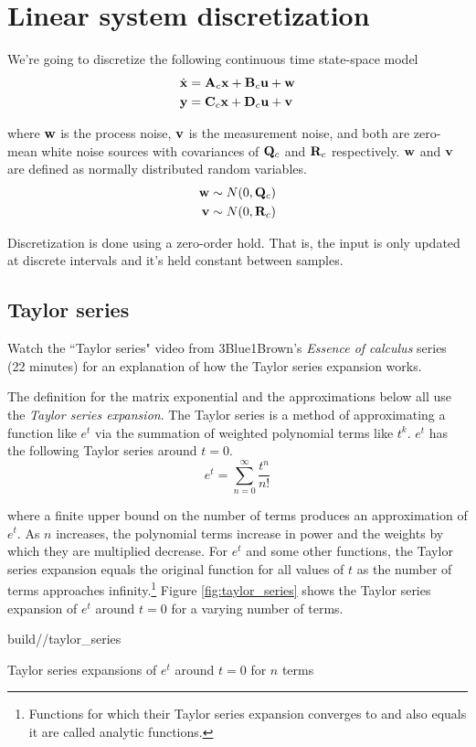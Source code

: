 \section{Linear system discretization}
\label{sec:linear_system_zoh}

We're going to discretize the following continuous time state-space model
\begin{align*}
  \dot{\mathbf{x}} &= \mathbf{A}_c\mathbf{x} + \mathbf{B}_c\mathbf{u} + \mathbf{w} \\
  \mathbf{y} &= \mathbf{C}_c\mathbf{x} + \mathbf{D}_c\mathbf{u} + \mathbf{v}
\end{align*}

where $\mathbf{w}$ is the process noise, $\mathbf{v}$ is the measurement noise, and
both are zero-mean white noise sources with covariances of $\mathbf{Q}_c$ and
$\mathbf{R}_c$ respectively. $\mathbf{w}$ and $\mathbf{v}$ are defined as normally
distributed random variables.
\begin{align*}
  \mathbf{w} &\sim N(0, \mathbf{Q}_c) \\
  \mathbf{v} &\sim N(0, \mathbf{R}_c)
\end{align*}

Discretization is done using a zero-order hold. That is, the input is only
updated at discrete intervals and it’s held constant between samples.

\subsection{Taylor series}
\begin{remark}
  Watch the ``Taylor series" video from 3Blue1Brown's \textit{Essence of
  calculus} series (22 minutes) \cite{bib:3b1b_calculus_taylor_series} for an
  explanation of how the Taylor series expansion works.
\end{remark}

The definition for the matrix exponential and the approximations below all use
the \textit{Taylor series expansion}. The Taylor series is a method of
approximating a function like $e^t$ via the summation of weighted polynomial
terms like $t^k$. $e^t$ has the following Taylor series around $t = 0$.
\begin{equation*}
  e^t = \sum_{n = 0}^\infty \frac{t^n}{n!}
\end{equation*}

where a finite upper bound on the number of terms produces an approximation of
$e^t$. As $n$ increases, the polynomial terms increase in power and the weights
by which they are multiplied decrease. For $e^t$ and some other functions, the
Taylor series expansion equals the original function for all values of $t$ as
the number of terms approaches infinity.\footnote{Functions for which their
Taylor series expansion converges to and also equals it are called analytic
functions.} Figure \ref{fig:taylor_series} shows the Taylor series expansion of
$e^t$ around $t = 0$ for a varying number of terms.
\begin{svg}{build/\chapterpath/taylor_series}
  \caption{Taylor series expansions of $e^t$ around $t = 0$ for $n$ terms}
  \label{fig:taylor_series}
\end{svg}

